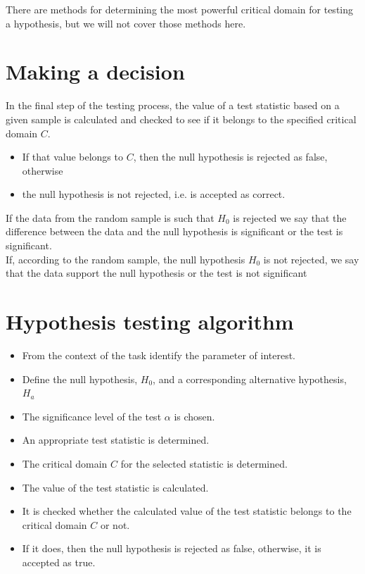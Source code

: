 \documentclass[a4paper, 12pt]{article}
\begin{document}
There are methods for determining the most powerful critical domain for testing a hypothesis, but we will not cover those methods here.\\

\section{Making a decision}

In the final step of the testing process, the value of a test statistic
based on a given sample is calculated and checked to see if it
belongs to the specified critical domain $C$.


\begin{itemize}
  
\item If that value belongs to $C$, then the null hypothesis is rejected as false,
otherwise
\item the null hypothesis is not rejected, i.e. is accepted as correct.


\end{itemize}


If the data from the random sample is such that $H_0$ is rejected we say that the difference between the data and the null hypothesis is significant or the test is significant.\\

If, according to the random sample, the null hypothesis $H_0$ is not rejected, we say that the data support the null hypothesis or the test is not significant

\section{Hypothesis testing algorithm}

\begin{itemize}
  \item [1.] From the context of the task identify the parameter of interest.
  \item [2.] Define the null hypothesis, $H_0$, and a corresponding alternative
  hypothesis, $H_a$
  \item [3.] The significance level of the test $\alpha$ is chosen.
  \item [4.] An appropriate test statistic is determined.
  \item [5.] The critical domain $C$ for the selected statistic is determined.
  \item [6.] The value of the test statistic is calculated.
  \item [7.] It is checked whether the calculated value of the test statistic
  belongs to the critical domain $C$ or not.
  \item [8.] If it does, then the null hypothesis is rejected as false, otherwise,
  it is accepted as true.
\end{itemize}
\end{document}
